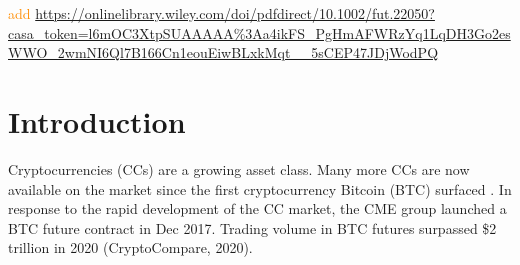 \documentclass[11pt,a4paper,english]{article}
\providecommand{\natp}[1]{\textcolor{darkorange}{#1}}
\begin{document}


\natp{add
  \url{https://onlinelibrary.wiley.com/doi/pdfdirect/10.1002/fut.22050?casa_token=l6mOC3XtpSUAAAAA\%3Aa4ikFS_PgHmAFWRzYq1LqDH3Go2esWWO_2wmNI6Ql7B166Cn1eouEiwBLxkMqt__5sCEP47JDjWodPQ}}


\clearpage
\section{Introduction}\label{sec:introduction}
Cryptocurrencies (CCs) are a growing asset class.
Many more CCs are now available on the market since the first
cryptocurrency Bitcoin (BTC) surfaced \citep{nakamoto2009}.
In response to the rapid development of the CC market, the CME group launched a BTC future contract in Dec 2017.
Trading volume in BTC futures surpassed \$2 trillion in 2020 (CryptoCompare, 2020). \medskip
\end{document}
